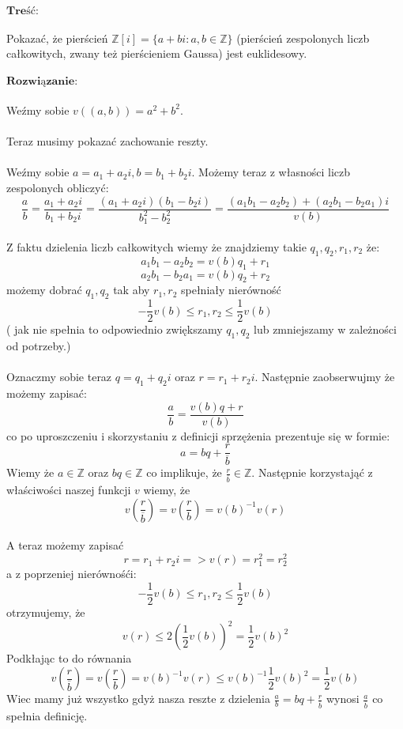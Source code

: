 $\textbf{Treść:}$  \\
\\
Pokazać, że pierścień $\mathbb{Z}[i] = \{a + bi : a, b \in \mathbb{Z}\}$ (pierścień zespolonych liczb
całkowitych, zwany też pierścieniem Gaussa) jest euklidesowy. \\ \\
$\textbf{Rozwiązanie:}$ \\
\\
Weźmy sobie $v((a,b)) = a^2 + b^2$.\\
\\
Teraz musimy pokazać zachowanie reszty.\\ \\
Weźmy sobie $a = a_1 + a_2i, b = b_1 + b_2i$. Możemy teraz z własności liczb zespolonych obliczyć:
\\
$$\frac{a}{b} = \frac{a_1 + a_2i}{b_1 + b_2i} = \frac{(a_1 + a_2i)(b_1 - b_2i)}{b_{1}^{2} - b_{2}^{2}} = \frac{(a_1b_1 - a_2b_2) + (a_2b_1 - b_2a_1)i}{v(b)}$$ \\
Z faktu dzielenia liczb całkowitych wiemy że znajdziemy takie $q_1,q_2,r_1,r_2$ że: \\
$$a_1b_1 - a_2b_2 = v(b)q_1 + r_1$$
$$a_2b_1 - b_2a_1 = v(b)q_2 + r_2$$
możemy dobrać $q_1,q_2$ tak aby $r_1,r_2$ spełniały nierówność $$-\frac{1}{2}v(b) \leq r_1,r_2 \leq \frac{1}{2}v(b)$$ ( jak nie spełnia to odpowiednio zwiększamy $q_1,q_2$ lub zmniejszamy w zależności od potrzeby.)
\\
\\ Oznaczmy sobie teraz $q = q_1 + q_2i$ oraz $r = r_1 + r_2i$. Następnie zaobserwujmy że możemy zapisać: $$\frac{a}{b} = \frac{v(b)q + r}{v(b)}$$ co po uproszczeniu i skorzystaniu z definicji sprzężenia prezentuje się w formie: $$a = bq + \frac{r}{\overline{b}}$$ Wiemy że $a \in \mathbb{Z}$ oraz $bq \in \mathbb{Z}$ co implikuje, że $\frac{r}{\overline{b}} \in \mathbb{Z}$. Następnie korzystająć z właściwości naszej funkcji $v$ wiemy, że $$v(\frac{r}{\overline{b}}) = v(\frac{r}{b}) = v(b)^{-1}v(r)$$ \\ A teraz możemy zapisać $$r = r_1 + r_2i => v(r) = r_{1}^{2} = r_{2}^{2}$$ a z poprzeniej nierównośći: $$-\frac{1}{2}v(b) \leq r_1,r_2 \leq \frac{1}{2}v(b)$$ otrzymujemy, że $$v(r) \leq 2(\frac{1}{2}v(b))^2 = \frac{1}{2}v(b)^2$$ Podkłając to do równania $$v(\frac{r}{\overline{b}}) = v(\frac{r}{b}) = v(b)^{-1}v(r) \leq v(b)^{-1}\frac{1}{2}v(b)^2 = \frac{1}{2}v(b)$$
Wiec mamy już wszystko gdyż nasza reszte z dzielenia $\frac{a}{b} = bq + \frac{r}{\overline{b}}$ wynosi $\frac{a}{\overline{b}}$ co spełnia definicję.


